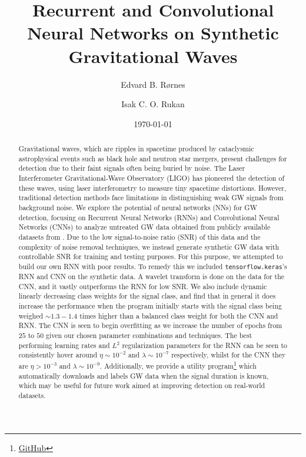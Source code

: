 \documentclass[%
reprint,
amsmath,amssymb,
aps,
]{revtex4-2}
\begin{document}
	
\title{Recurrent and Convolutional Neural Networks on Synthetic Gravitational Waves}
\author{Edvard B. Rørnes}
\author{Isak C. O. Rukan}
\date{\today}

\begin{abstract}
	Gravitational waves, which are ripples in spacetime produced by cataclysmic astrophysical events such as black hole and neutron star mergers, present challenges for detection due to their faint signals often being buried by noise. The Laser Interferometer Gravitational-Wave Observatory (LIGO) has pioneered the detection of these waves, using laser interferometry to measure tiny spacetime distortions. However, traditional detection methods face limitations in distinguishing weak GW signals from background noise. We explore the potential of neural networks (NNs) for GW detection, focusing on Recurrent Neural Networks (RNNs) and Convolutional Neural Networks (CNNs) to analyze untreated GW data obtained from publicly available datasets from \cite{gwosc}. Due to the low signal-to-noise ratio (SNR) of this data and the complexity of noise removal techniques, we instead generate synthetic GW data with controllable SNR for training and testing purposes. For this purpose, we attempted to build our own RNN with poor results. To remedy this we included \texttt{tensorflow.keras}'s \cite{tensorflow2015-whitepaper} RNN and CNN on the synthetic data. A wavelet transform is done on the data for the CNN, and it vastly outperforms the RNN for low SNR. We also include dynamic linearly decreasing class weights for the signal class, and find that in general it does increase the performance when the program initially starts with the signal class being weighed $\sim1.3-1.4$ times higher than a balanced class weight for both the CNN and RNN. The CNN is seen to begin overfitting as we increase the number of epochs from $25$ to $50$ given our chosen parameter combinations and techniques. The best performing learning rates and $L^2$ regularization parameters for the RNN can be seen to consistently hover around $\eta\sim10^{-2}$ and $\lambda\sim10^{-7}$ respectively, whilst for the CNN they are $\eta>10^{-3}$ and $\lambda\sim10^{-9}$. Additionally, we provide a utility program\footnote{\href{https://github.com/EdvardRornes/FYS-STK4155/tree/main/Project3}{GitHub}} which automatically downloads and labels GW data when the signal duration is known, which may be useful for future work aimed at improving detection on real-world datasets.
\end{abstract}
\end{document}
